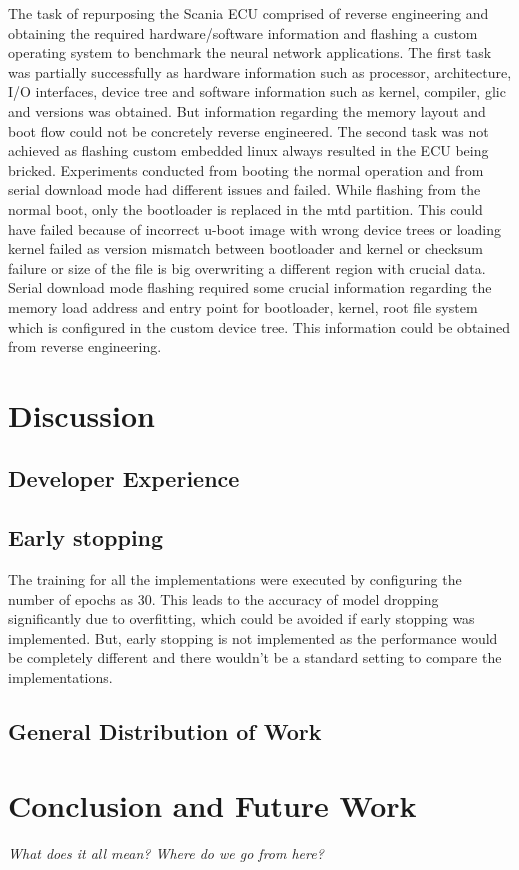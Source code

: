 The task of repurposing the Scania ECU comprised of reverse engineering and obtaining the required hardware/software information and flashing a custom operating system to benchmark the neural network applications.
The first task was partially successfully as hardware information such as processor, architecture, I/O interfaces, device tree and software information such as kernel, compiler, glic and versions was obtained. But information regarding the memory layout and boot flow could not be concretely reverse engineered.
The second task was not achieved as flashing custom embedded linux always resulted in the ECU being bricked. Experiments conducted from booting the normal operation and from serial download mode had different issues and failed. While flashing from the normal boot, only the bootloader is replaced in the mtd partition. This could have failed because of incorrect u-boot image with wrong device trees or loading kernel failed as version mismatch between bootloader and kernel or checksum failure or size of the file is big overwriting a different region with crucial data. Serial download mode flashing required some crucial information regarding the memory load address and entry point for bootloader, kernel, root file system which is configured in the custom device tree. This information could be obtained from reverse engineering.


\chapter{Discussion}

\section{Developer Experience}

\section{Early stopping}
The training for all the implementations were executed by configuring the number of epochs as 30. This leads to the accuracy of model dropping significantly due to overfitting, which could be avoided if early stopping was implemented.
But, early stopping is not implemented as the performance would be completely different and there wouldn't be a standard setting to compare the implementations.

\section{General Distribution of Work}

\chapter{Conclusion and Future Work}
\textit{What does it all mean? Where do we go from here?}
